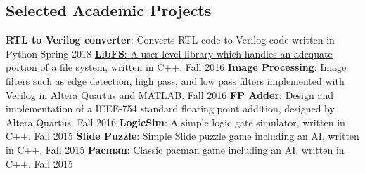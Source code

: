 \documentclass[../main.tex]{subfiles}
\begin{document}
\begin{category}
\section{Selected Academic Projects}
	\citembullet \textbf{RTL to Verilog converter}: Converts RTL code to Verilog code written in Python \hfill Spring 2018
    \href{https://github.com/mehr74/LibFS}{\citembullet \textbf{LibFS}:
    A user-level library which handles an adequate portion of a file system, written in C++.} \hspace*{13.5cm} Fall 2016   
    \citembullet \textbf{Image Processing}:
    Image filters such as edge detection,
    high pass, and low pass filters implemented with Verilog in Altera Quartus and MATLAB. \hspace*{5cm} {Fall 2016}
    \citembullet \textbf{FP Adder}:
    Design and implementation of a IEEE-754 standard floating point addition, designed by Altera Quartus. \hfill Fall 2016
    \citembullet \textbf{LogicSim}:
    A simple logic gate simulator, written in C++. \hfill Fall 2015
    \citembullet \textbf{Slide Puzzle}:
    Simple Slide puzzle game including an AI, written in C++. \hfill Fall 2015
    \citembullet \textbf{Pacman}:
    Classic pacman game including an AI, written in C++. \hfill Fall 2015
    \\[-12pt]
\end{category}
\end{document}
